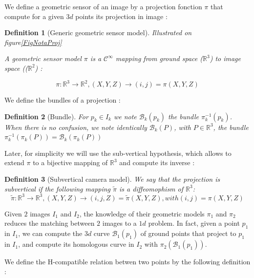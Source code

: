 \documentclass[a4paper]{article}
\newcommand{\RR}{\ensuremath{\mathbb{R}}}
\newcommand{\Bund}[1]{\ensuremath{\mathcal{B}_{#1}}}
\newcommand{\BundO}{\Bund{1}}
\newcommand{\BundK}{\Bund{k}}
\newcommand{\PiVert}{\widetilde{\pi}}
\newtheorem{definition}{Definition}
\begin{document}

We define a geometric sensor of an image by a projection fonction $\pi$ that compute for a given $3d$
points its projection in image :

\begin{definition}[Generic geometric sensor model]  

\emph{Illustrated on figure\ref{FigNotaProj}}

A geometric sensor model $\pi$ is a $\mathcal{C}^{\infty}$ mapping from 
ground space ($\RR^3$) to image space (($\RR^2$) :

\begin{equation}
  \pi :  \RR^3  \rightarrow \RR^2  ,  (X,Y,Z)  \rightarrow (i,j) = \pi(X,Y,Z) \label{Eq:Proj}
\end{equation}
\end{definition}

We define the bundles of a projection :

\begin{definition}[Bundle]
For $p_k \in I_k$ we note $\BundK(p_k)$  the bundle $\pi_k^{-1}(p_k)$. When there is no confusion,
we note identically  $\BundK(P)$, with $P\in \RR^3$,
 the bundle $\pi_k^{-1}(\pi_k(P)) = \BundK(\pi_k(P))$
\end{definition}


Later, for simplicity we will use the  sub-vertical hypothesis, which allows to extend $\pi$ to a
bijective mapping of $\RR^3$ and compute its inverse  :

\begin{definition}[Subvertical camera model]  
We say that the projection is subvertical if the following mapping $\PiVert$ is a diffeomophism of $\RR^3$:
\begin{equation}
  \PiVert :  \RR^3  \rightarrow \RR^3  ,  (X,Y,Z)  \rightarrow (i,j,Z) = \PiVert(X,Y,Z)  , with (i,j) = \pi(X,Y,Z) \label{PiInvert}
\end{equation}
\end{definition}

Given $2$ images $I_1$ and $I_2$, the knowledge  of their geometric models $\pi_1$ and  $\pi_2$
reduces the matching between $2$ images to a $1d$ problem. In fact, given a point $p_1$ in $I_1$,
we can compute the $3d$ curve $\BundO(p_1)$ of  ground points that project to $p_1$ in $I_1$, and compute its
homologous curve in $I_2$ with $\pi_2(\BundO(p_1))$.



We define the H-compatible relation betwen two points
by the following definition :
\end{document}
